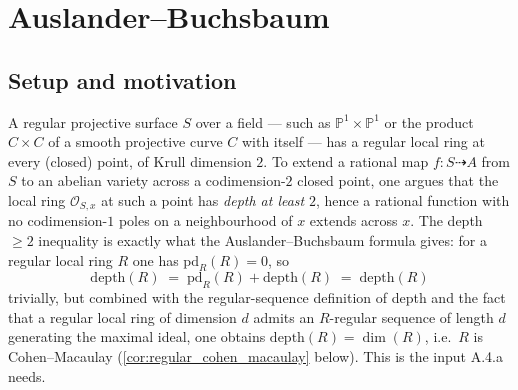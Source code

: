 \chapter{Auslander--Buchsbaum}
\label{chap:Albanese_AuslanderBuchsbaum}


\section{Setup and motivation}
\label{sec:ab_setup}

A regular projective surface \(S\) over a field --- such as \(\mathbb{P}^1 \times \mathbb{P}^1\)
or the product \(C \times C\) of a smooth projective curve \(C\) with itself --- has a regular
local ring at every (closed) point, of Krull dimension \(2\). To extend a rational map
\(f : S \dashrightarrow A\) from \(S\) to an abelian variety across a codimension-\(2\) closed
point, one argues that the local ring \(\mathcal{O}_{S,x}\) at such a point has \emph{depth at
least} \(2\), hence a rational function with no codimension-\(1\) poles on a neighbourhood of \(x\)
extends across \(x\). The depth \(\geq 2\) inequality is exactly what the
Auslander--Buchsbaum formula gives: for a regular local ring \(R\) one has \(\text{pd}_R(R) = 0\),
so
\[
  \text{depth}(R) \;=\; \text{pd}_R(R) + \text{depth}(R) \;=\; \text{depth}(R)
\]
trivially, but combined with the regular-sequence definition of depth and the fact that a
regular local ring of dimension \(d\) admits an \(R\)-regular sequence of length \(d\) generating
the maximal ideal, one obtains \(\text{depth}(R) = \dim(R)\), i.e.\ \(R\) is Cohen--Macaulay
(\cref{cor:regular_cohen_macaulay} below). This is the input A.4.a needs.

